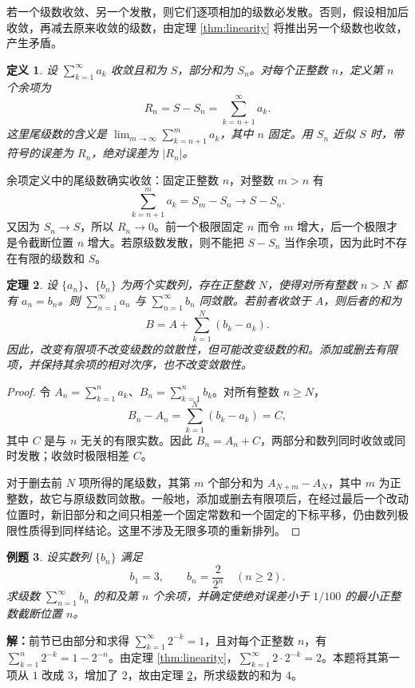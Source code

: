 \documentclass[UTF8,fontset=fandol,11pt]{ctexart}
\newtheorem{definition}{定义}[section]
\newtheorem{theorem}[definition]{定理}
\newtheorem{example}[definition]{例题}
\begin{document}
若一个级数收敛、另一个发散，则它们逐项相加的级数必发散。否则，假设相加后收敛，再减去原来收敛的级数，由定理 \ref{thm:linearity} 将推出另一个级数也收敛，产生矛盾。\par
\begin{definition}
\label{def:remainder}设 $\sum_{k=1}^{\infty}a_k$ 收敛且和为 $S$，部分和为 $S_n$。对每个正整数 $n$，定义第 $n$ 个余项为
\[
R_n=S-S_n=\sum_{k=n+1}^{\infty}a_k.
\]
这里尾级数的含义是 $\lim_{m\to\infty}\sum_{k=n+1}^{m}a_k$，其中 $n$ 固定。用 $S_n$ 近似 $S$ 时，带符号的误差为 $R_n$，绝对误差为 $|R_n|$。
\end{definition}
余项定义中的尾级数确实收敛：固定正整数 $n$，对整数 $m>n$ 有
\[
\sum_{k=n+1}^{m}a_k=S_m-S_n\longrightarrow S-S_n.
\]
又因为 $S_n\to S$，所以 $R_n\to0$。前一个极限固定 $n$ 而令 $m$ 增大，后一个极限才是令截断位置 $n$ 增大。若原级数发散，则不能把 $S-S_n$ 当作余项，因为此时不存在有限的级数和 $S$。\par
\begin{theorem}
\label{thm:finite-change}设 $\{a_n\}$、$\{b_n\}$ 为两个实数列，存在正整数 $N$，使得对所有整数 $n>N$ 都有 $a_n=b_n$。则 $\sum_{n=1}^{\infty}a_n$ 与 $\sum_{n=1}^{\infty}b_n$ 同敛散。若前者收敛于 $A$，则后者的和为
\[
B=A+\sum_{k=1}^{N}(b_k-a_k).
\]
因此，改变有限项不改变级数的敛散性，但可能改变级数的和。添加或删去有限项，并保持其余项的相对次序，也不改变敛散性。
\end{theorem}
\begin{proof}
令 $A_n=\sum_{k=1}^{n}a_k$、$B_n=\sum_{k=1}^{n}b_k$。对所有整数 $n\geq N$，
\[
B_n-A_n=\sum_{k=1}^{N}(b_k-a_k)=C,
\]
其中 $C$ 是与 $n$ 无关的有限实数。因此 $B_n=A_n+C$，两部分和数列同时收敛或同时发散；收敛时极限相差 $C$。

对于删去前 $N$ 项所得的尾级数，其第 $m$ 个部分和为 $A_{N+m}-A_N$，其中 $m$ 为正整数，故它与原级数同敛散。一般地，添加或删去有限项后，在经过最后一个改动位置时，新旧部分和之间只相差一个固定常数和一个固定的下标平移，仍由数列极限性质得到同样结论。这里不涉及无限多项的重新排列。
\end{proof}
\begin{example}
设实数列 $\{b_n\}$ 满足
\[
b_1=3,\qquad b_n=\frac{2}{2^n}\quad(n\geq2).
\]
求级数 $\sum_{n=1}^{\infty}b_n$ 的和及第 $n$ 个余项，并确定使绝对误差小于 $1/100$ 的最小正整数截断位置 $n$。
\end{example}
\par\noindent\textbf{解：}前节已由部分和求得 $\sum_{k=1}^{\infty}2^{-k}=1$，且对每个正整数 $n$，有 $\sum_{k=1}^{n}2^{-k}=1-2^{-n}$。由定理 \ref{thm:linearity}，$\sum_{k=1}^{\infty}2\cdot2^{-k}=2$。本题将其第一项从 $1$ 改成 $3$，增加了 $2$，故由定理 \ref{thm:finite-change}，所求级数的和为 $4$。
\end{document}
